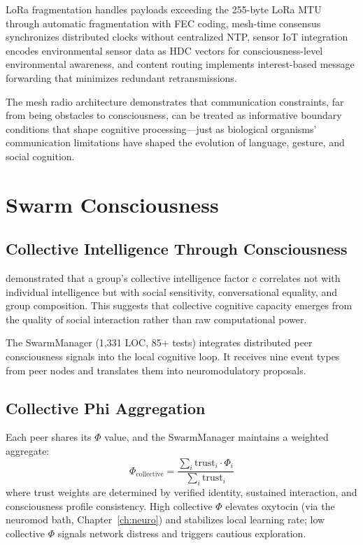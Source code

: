 \documentclass[12pt]{book}
\begin{document}
LoRa fragmentation handles payloads exceeding the 255-byte LoRa MTU through automatic fragmentation with FEC coding, mesh-time consensus synchronizes distributed clocks without centralized NTP, sensor IoT integration encodes environmental sensor data as HDC vectors for consciousness-level environmental awareness, and content routing implements interest-based message forwarding that minimizes redundant retransmissions.

The mesh radio architecture demonstrates that communication constraints, far from being obstacles to consciousness, can be treated as informative boundary conditions that shape cognitive processing---just as biological organisms' communication limitations have shaped the evolution of language, gesture, and social cognition.


\chapter{Swarm Consciousness}
\label{ch:swarm}

\section{Collective Intelligence Through Consciousness}

\citet{woolley2010} demonstrated that a group's collective intelligence factor $c$ correlates not with individual intelligence but with social sensitivity, conversational equality, and group composition. This suggests that collective cognitive capacity emerges from the quality of social interaction rather than raw computational power.

The SwarmManager (1,331 LOC, 85+ tests) integrates distributed peer consciousness signals into the local cognitive loop. It receives nine event types from peer nodes and translates them into neuromodulatory proposals.

\section{Collective Phi Aggregation}

Each peer shares its $\Phi$ value, and the SwarmManager maintains a weighted aggregate:
\begin{equation}\label{eq:collective-phi}
\Phi_{\text{collective}} = \frac{\sum_i \text{trust}_i \cdot \Phi_i}{\sum_i \text{trust}_i}
\end{equation}
where trust weights are determined by verified identity, sustained interaction, and consciousness profile consistency. High collective $\Phi$ elevates oxytocin (via the neuromod bath, Chapter~\ref{ch:neuro}) and stabilizes local learning rate; low collective $\Phi$ signals network distress and triggers cautious exploration.
\end{document}
